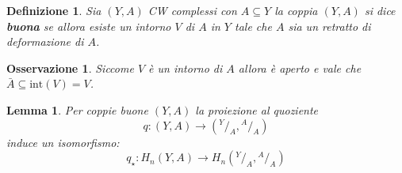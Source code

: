 \documentclass[10pt, twoside=false, x11names]{scrbook}
\newtheorem{lemma}[theorem]{Lemma}
\newtheorem{osservation}[theorem]{Osservazione}
\newtheorem{definition}[theorem]{Definizione}
\newcommand*\quot[2]{{^{\textstyle #1}\big/_{\textstyle #2}}}
\begin{document}
\begin{definition}
  Sia $ (Y,A) $ CW complessi con $ A \subseteq Y $
  la coppia $ (Y,A) $ si dice \textbf{buona} se
  allora esiste un intorno $ V $ di $ A $ in $ Y $ tale che $ A $
  sia un retratto di deformazione di $ A $.
\end{definition}
\begin{osservation}
  Siccome $ V $ è un intorno di $ A $ allora è aperto e vale
  che $ \bar{A} \subseteq \mathrm{int}(V) = V $.
\end{osservation}

\begin{lemma}
  Per coppie buone $ (Y,A) $ la proiezione al quoziente
  \[
    q \colon (Y,A) \to \left(\quot{Y}{A}, \quot{A}{A} \right)
  \]
  induce un isomorfismo:
  \[
    q_\star \colon H_n(Y,A) \to  H_n(\quot{Y}{A}, \quot{A}{A})
  \]
\end{lemma}
\end{document}

